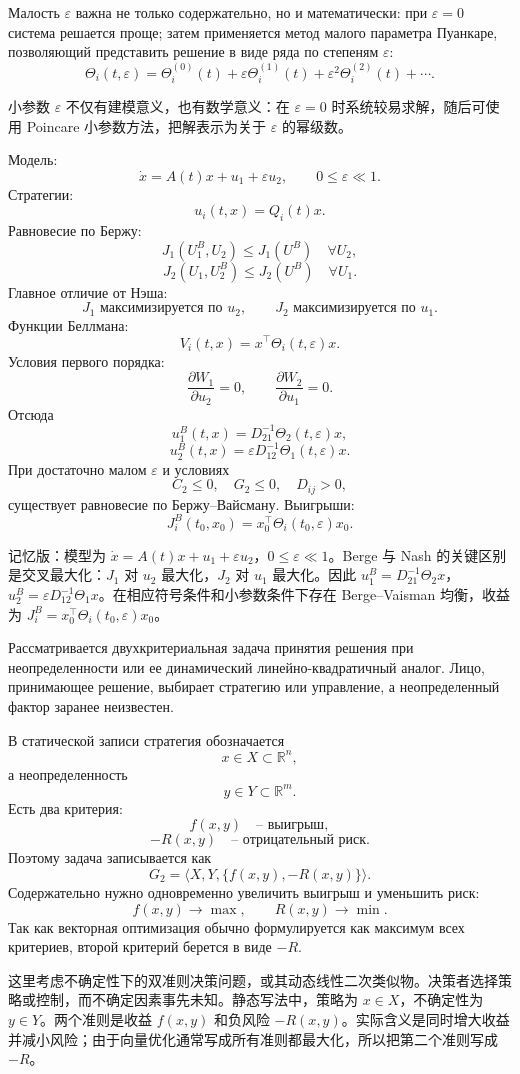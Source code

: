 \documentclass[12pt,a4paper]{article}
\newcommand{\R}{\mathbb{R}}
\newcommand{\memory}{}
\newcommand{\zh}[1]{\par\noindent #1\par}
\begin{document}
Малость \(\varepsilon\) важна не только содержательно, но и математически: при \(\varepsilon=0\) система решается проще; затем применяется метод малого параметра Пуанкаре, позволяющий представить решение в виде ряда по степеням \(\varepsilon\):
\[
\Theta_i(t,\varepsilon)=\Theta_i^{(0)}(t)+\varepsilon\Theta_i^{(1)}(t)+\varepsilon^2\Theta_i^{(2)}(t)+\cdots .
\]
\zh{小参数 \(\varepsilon\) 不仅有建模意义，也有数学意义：在 \(\varepsilon=0\) 时系统较易求解，随后可使用 Poincare 小参数方法，把解表示为关于 \(\varepsilon\) 的幂级数。}

\memory
Модель:
\[
\dot x=A(t)x+u_1+\varepsilon u_2,
\qquad 0\le \varepsilon\ll 1.
\]
Стратегии:
\[
u_i(t,x)=Q_i(t)x.
\]
Равновесие по Бержу:
\[
J_1(U_1^B,U_2)\le J_1(U^B)\quad \forall U_2,
\]
\[
J_2(U_1,U_2^B)\le J_2(U^B)\quad \forall U_1.
\]
Главное отличие от Нэша:
\[
J_1 \text{ максимизируется по } u_2,
\qquad
J_2 \text{ максимизируется по } u_1.
\]
Функции Беллмана:
\[
V_i(t,x)=x^{\top}\Theta_i(t,\varepsilon)x.
\]
Условия первого порядка:
\[
\frac{\partial W_1}{\partial u_2}=0,
\qquad
\frac{\partial W_2}{\partial u_1}=0.
\]
Отсюда
\[
u_1^B(t,x)=D_{21}^{-1}\Theta_2(t,\varepsilon)x,
\]
\[
u_2^B(t,x)=\varepsilon D_{12}^{-1}\Theta_1(t,\varepsilon)x.
\]
При достаточно малом \(\varepsilon\) и условиях
\[
C_2\le 0,
\quad G_2\le 0,
\quad D_{ij}>0,
\]
существует равновесие по Бержу--Вайсману. Выигрыши:
\[
J_i^B(t_0,x_0)=x_0^{\top}\Theta_i(t_0,\varepsilon)x_0.
\]
\zh{记忆版：模型为 \(\dot x=A(t)x+u_1+\varepsilon u_2\)，\(0\le\varepsilon\ll1\)。Berge 与 Nash 的关键区别是交叉最大化：\(J_1\) 对 \(u_2\) 最大化，\(J_2\) 对 \(u_1\) 最大化。因此 \(u_1^B=D_{21}^{-1}\Theta_2x\)，\(u_2^B=\varepsilon D_{12}^{-1}\Theta_1x\)。在相应符号条件和小参数条件下存在 Berge--Vaisman 均衡，收益为 \(J_i^B=x_0^\top\Theta_i(t_0,\varepsilon)x_0\)。}

\newpage
{}


Рассматривается двухкритериальная задача принятия решения при неопределенности или ее динамический линейно-квадратичный аналог. Лицо, принимающее решение, выбирает стратегию или управление, а неопределенный фактор заранее неизвестен.

В статической записи стратегия обозначается
\[
x\in X\subset\R^n,
\]
а неопределенность
\[
y\in Y\subset\R^m.
\]
Есть два критерия:
\[
f(x,y)\quad \text{-- выигрыш},
\]
\[
-R(x,y)\quad \text{-- отрицательный риск}.
\]
Поэтому задача записывается как
\[
G_2=\langle X,Y,\{f(x,y),-R(x,y)\}\rangle.
\]
Содержательно нужно одновременно увеличить выигрыш и уменьшить риск:
\[
f(x,y)\to\max,
\qquad
R(x,y)\to\min.
\]
Так как векторная оптимизация обычно формулируется как максимум всех критериев, второй критерий берется в виде \(-R\).
\zh{这里考虑不确定性下的双准则决策问题，或其动态线性二次类似物。决策者选择策略或控制，而不确定因素事先未知。静态写法中，策略为 \(x\in X\)，不确定性为 \(y\in Y\)。两个准则是收益 \(f(x,y)\) 和负风险 \(-R(x,y)\)。实际含义是同时增大收益并减小风险；由于向量优化通常写成所有准则都最大化，所以把第二个准则写成 \(-R\)。}
\end{document}
